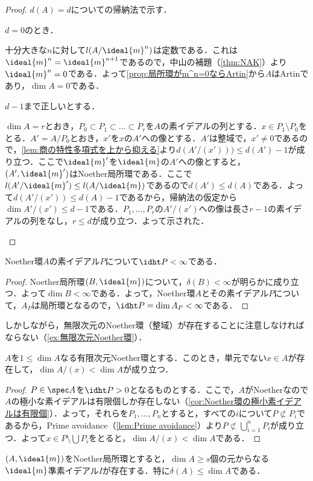 \begin{proof}
	$d(A)=d$についての帰納法で示す．
	\begin{step}
		\item $d=0$のとき．
		
		十分大きな$n$に対して$l(A/\ideal{m}^n)$は定数である．これは$\ideal{m}^n=\ideal{m}^{n+1}$であるので，中山の補題（\ref{thm:NAK}）より$\ideal{m}^n=0$である．よって\ref{prop:局所環がm^n=0ならArtin}から$A$はArtinであり，$\dim A=0$である．
		
		\item $d-1$まで正しいとする．
		
		$\dim A=r$とおき，$P_0\subset P_1\subset\dots\subset P_r$を$A$の素イデアルの列とする．$x\in P_1\setminus P_0$をとる．$A'=A/P_0$とおき，$x'$を$x$の$A'$への像とする．$A'$は整域で，$x'\neq0$であるので，\ref{lem:商の特性多項式を上から抑える}より$d(A'/(x')))\leq d(A')-1$が成り立つ．ここで$\ideal{m}'$を$\ideal{m}$の$A'$への像とすると，$(A',\ideal{m}')$はNoether局所環である．ここで$l(A'/\ideal{m}')\leq l(A/\ideal{m})$であるので$d(A')\leq d(A)$である．よって$d(A'/(x'))\leq d(A)-1$であるから，帰納法の仮定から$\dim A'/(x')\leq d-1$である．$P_1,\dots,P_r$の$A'/(x')$への像は長さ$r-1$の素イデアルの列をなし，$r\leq d$が成り立つ．よって示された．
	\end{step}
\end{proof}

\begin{cor}
	Noether環$A$の素イデアル$P$について$\idht P<\infty$である．
\end{cor}

\begin{proof}
	Noether局所環$(B,\ideal{m})$について，$\delta(B)<\infty$が明らかに成り立つ．よって$\dim B<\infty$である．よって，Noether環$A$とその素イデアル$P$について，$A_P$は局所環となるので，$\idht P=\dim A_P<\infty$である．
\end{proof}

しかしながら，無限次元のNoether環（整域）が存在することに注意しなければならない（\ref{ex:無限次元Noether環}）．

\begin{lem}
	$A$を$1\leq\dim A$なる有限次元Noether環とする．このとき，単元でない$x\in A$が存在して，$\dim A/(x)<\dim A$が成り立つ．
\end{lem}

\begin{proof}
	$P\in\spec A$を$\idht P>0$となるものとする．ここで，$A$がNoetherなので$A$の極小な素イデアルは有限個しか存在しない（\ref{cor:Noether環の極小素イデアルは有限個}）．よって，それらを$P_1,\dots, P_n$とすると，すべての$i$について$P\not\subset P_i$であるから，Prime avoidance（\ref{lem:Prime avoidance}）より$P\not\subset\bigcup_{i=1}^nP_i$が成り立つ．よって$x\in P\setminus\bigcup P_i$をとると，$\dim A/(x)<\dim A$である．

\end{proof}
\begin{prop}\label{prop:dim A geq delta(A)}
	$(A,\ideal{m})$をNoether局所環とすると，$\dim A\geq s$個の元からなる$\ideal{m}$準素イデアル$I$が存在する．特に$\delta(A)\leq\dim A$である．
\end{prop}

